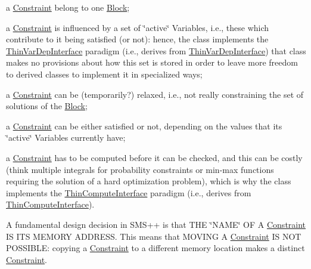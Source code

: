 \begin{DoxyItemize}
\item a \mbox{\hyperlink{class_s_m_spp__di__unipi__it_1_1_constraint}{Constraint}} belong to one \mbox{\hyperlink{class_s_m_spp__di__unipi__it_1_1_block}{Block}};
\item a \mbox{\hyperlink{class_s_m_spp__di__unipi__it_1_1_constraint}{Constraint}} is influenced by a set of \char`\"{}active\char`\"{} Variables, i.\+e., these which contribute to it being satisfied (or not)\+: hence, the class implements the \mbox{\hyperlink{class_s_m_spp__di__unipi__it_1_1_thin_var_dep_interface}{Thin\+Var\+Dep\+Interface}} paradigm (i.\+e., derives from \mbox{\hyperlink{class_s_m_spp__di__unipi__it_1_1_thin_var_dep_interface}{Thin\+Var\+Dep\+Interface}}) that class makes no provisions about how this set is stored in order to leave more freedom to derived classes to implement it in specialized ways;
\item a \mbox{\hyperlink{class_s_m_spp__di__unipi__it_1_1_constraint}{Constraint}} can be (temporarily?) relaxed, i.\+e., not really constraining the set of solutions of the \mbox{\hyperlink{class_s_m_spp__di__unipi__it_1_1_block}{Block}};
\item a \mbox{\hyperlink{class_s_m_spp__di__unipi__it_1_1_constraint}{Constraint}} can be either satisfied or not, depending on the values that its \char`\"{}active\char`\"{} Variables currently have;
\item a \mbox{\hyperlink{class_s_m_spp__di__unipi__it_1_1_constraint}{Constraint}} has to be computed before it can be checked, and this can be costly (think multiple integrals for probability constraints or min-\/max functions requiring the solution of a hard optimization problem), which is why the class implements the \mbox{\hyperlink{class_s_m_spp__di__unipi__it_1_1_thin_compute_interface}{Thin\+Compute\+Interface}} paradigm (i.\+e., derives from \mbox{\hyperlink{class_s_m_spp__di__unipi__it_1_1_thin_compute_interface}{Thin\+Compute\+Interface}}).
\end{DoxyItemize}

A fundamental design decision in S\+M\+S++ is that T\+HE \char`\"{}\+N\+A\+M\+E\char`\"{} OF A \mbox{\hyperlink{class_s_m_spp__di__unipi__it_1_1_constraint}{Constraint}} IS I\+TS M\+E\+M\+O\+RY A\+D\+D\+R\+E\+SS. This means that M\+O\+V\+I\+NG A \mbox{\hyperlink{class_s_m_spp__di__unipi__it_1_1_constraint}{Constraint}} IS N\+OT P\+O\+S\+S\+I\+B\+LE\+: copying a \mbox{\hyperlink{class_s_m_spp__di__unipi__it_1_1_constraint}{Constraint}} to a different memory location makes a distinct \mbox{\hyperlink{class_s_m_spp__di__unipi__it_1_1_constraint}{Constraint}}. 

